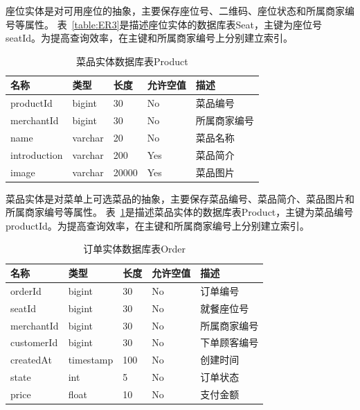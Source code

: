 座位实体是对可用座位的抽象，主要保存座位号、二维码、座位状态和所属商家编号等属性。
表~\ref{table:ER3}是描述座位实体的数据库表Seat，主键为座位号seatId。为提高查询效率，在主键和所属商家编号上分别建立索引。

\begin{table}[htbp!]\footnotesize
  \centering
  \caption{菜品实体数据库表Product}
  \vspace{2mm}
  \begin{tabular}{lllll}
  \toprule
  \textbf{名称}&\textbf{类型}&\textbf{长度}&\textbf{允许空值}&\textbf{描述}\\
  \midrule 
  productId& bigint& 30& No& 菜品编号\\
  \hline
  merchantId& bigint& 30& No& 所属商家编号\\
  \hline
  name& varchar& 20& No& 菜品名称\\
  \hline
  introduction& varchar& 200& Yes& 菜品简介\\
  \hline
  image& varchar& 20000& Yes& 菜品图片\\
  \bottomrule
  \end{tabular}
  \label{table:ER4}
\end{table}

菜品实体是对菜单上可选菜品的抽象，主要保存菜品编号、菜品简介、菜品图片和所属商家编号等属性。
表~\ref{table:ER4}是描述菜品实体的数据库表Product，主键为菜品编号productId。为提高查询效率，在主键和所属商家编号上分别建立索引。

\begin{table}[htbp!]\footnotesize
  \centering
  \caption{订单实体数据库表Order}
  \vspace{2mm}
  \begin{tabular}{lllll}
  \toprule
  \textbf{名称}&\textbf{类型}&\textbf{长度}&\textbf{允许空值}&\textbf{描述}\\
  \midrule 
  orderId& bigint& 30& No& 订单编号\\
  \hline
  seatId& bigint& 30& No& 就餐座位号\\
  \hline
  merchantId& bigint& 30& No& 所属商家编号\\
  \hline
  customerId& bigint& 30& No& 下单顾客编号\\
  \hline
  createdAt& timestamp& 100& No& 创建时间\\
  \hline
  state& int& 5& No& 订单状态\\
  \hline
  price& float& 10& No& 支付金额\\
  \bottomrule
  \end{tabular}
  \label{table:ER5}
\end{table}

